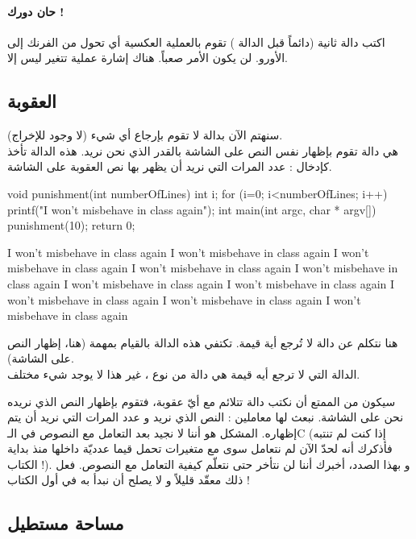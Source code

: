 \paragraph{حان دورك !}
اكتب دالة ثانية (دائماً قبل الدالة 
)
تقوم بالعملية العكسية أي تحول من الفرنك إلى الأورو. لن يكون الأمر صعباً. هناك إشارة عملية تتغير ليس إلا.

\subsection{العقوبة}

سنهتم الآن بدالة لا تقوم بإرجاع أي شيء (لا وجود للإخراج).\\
هي دالة تقوم بإظهار نفس النص على الشاشة بالقدر الذي نحن نريد. هذه الدالة تأخذ كإدخال : عدد المرات التي نريد أن يظهر بها نص العقوبة على الشاشة.

\begin{Csource}
void punishment(int numberOfLines)
{
	int i;
	for (i=0; i<numberOfLines; i++){
		printf("I won't misbehave in class again\n");
	}
}
int main(int argc, char * argv[])
{
	punishment(10);
	return 0;
}
\end{Csource}

\begin{Console}
I won't misbehave in class again
I won't misbehave in class again
I won't misbehave in class again
I won't misbehave in class again
I won't misbehave in class again
I won't misbehave in class again
I won't misbehave in class again
I won't misbehave in class again
I won't misbehave in class again
I won't misbehave in class again
\end{Console}

هنا نتكلم عن دالة لا تُرجع أية قيمة. تكتفي هذه الدالة بالقيام بمهمة (هنا، إظهار النص على الشاشة).\\
الدالة التي لا ترجع أيه قيمة هي دالة من نوع 
،
غير هذا لا يوجد شيء مختلف.

سيكون من الممتع أن نكتب دالة 
تتلائم مع أيّ عقوبة، فتقوم بإظهار النص الذي نريده نحن على الشاشة. نبعث لها معاملين : النص الذي نريد و عدد المرات التي نريد أن يتم إظهاره. المشكل هو أننا لا نجيد بعد التعامل مع النصوص في الـ\textenglish{C}
(إذا كنت لم تنتبه فأذكرك أنه لحدّ الآن لم نتعامل سوى مع متغيرات تحمل قيما عدديّة داخلها منذ بداية الكتاب !). و بهذا الصدد، أخبرك أننا لن نتأخر حتى نتعلّم كيفية التعامل مع النصوص. فعل ذلك معقّد قليلاً و لا يصلح أن نبدأ به في أول الكتاب !

\subsection{مساحة مستطيل}

